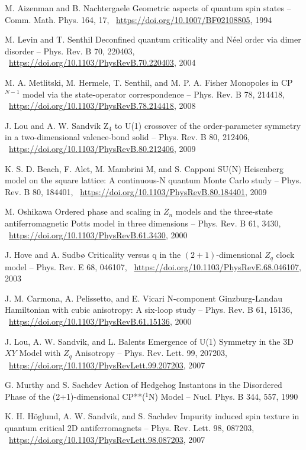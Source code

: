 \documentclass[11pt]{article}
\begin{document}
\begin{thebibliography}{3}
M. Aizenman and B. Nachtergaele Geometric aspects of quantum spin states -- Comm. Math. Phys. 164, 17,  ~\url{https://doi.org/10.1007/BF02108805}, 1994

M. Levin and T. Senthil Deconfined quantum criticality and Néel order via dimer disorder -- Phys. Rev. B 70, 220403,  ~\url{https://doi.org/10.1103/PhysRevB.70.220403}, 2004

M. A. Metlitski, M. Hermele, T. Senthil, and M. P. A. Fisher Monopoles in CP$^{N−1}$ model via the state-operator correspondence -- Phys. Rev. B 78, 214418, ~\url{https://doi.org/10.1103/PhysRevB.78.214418}, 2008

J. Lou and A. W. Sandvik Z$_4$ to U(1) crossover of the order-parameter symmetry in a two-dimensional valence-bond solid -- Phys. Rev. B 80, 212406,  ~\url{https://doi.org/10.1103/PhysRevB.80.212406}, 2009

K. S. D. Beach, F. Alet, M. Mambrini M, and S. Capponi SU(N) Heisenberg model on the square lattice: A continuous-N quantum Monte Carlo study -- Phys. Rev. B 80, 184401,  ~\url{https://doi.org/10.1103/PhysRevB.80.184401}, 2009

 M. Oshikawa Ordered phase and scaling in $Z_n$ models and the three-state antiferromagnetic Potts model in three dimensions -- Phys. Rev. B 61, 3430,  ~\url{https://doi.org/10.1103/PhysRevB.61.3430}, 2000

J. Hove and A. Sudbø Criticality versus q in the $(2+1)$-dimensional $Z_q$ clock model -- Phys. Rev. E 68, 046107,  ~\url{https://doi.org/10.1103/PhysRevE.68.046107}, 2003

J. M. Carmona, A. Pelissetto, and E. Vicari N-component Ginzburg-Landau Hamiltonian with cubic anisotropy: A six-loop study -- Phys. Rev. B 61, 15136,  ~\url{https://doi.org/10.1103/PhysRevB.61.15136}, 2000

J. Lou, A. W. Sandvik, and L. Balents Emergence of U(1) Symmetry in the 3D $XY$ Model with $Z_q$ Anisotropy -- Phys. Rev. Lett. 99, 207203,  ~\url{https://doi.org/10.1103/PhysRevLett.99.207203}, 2007

G. Murthy and S. Sachdev Action of Hedgehog Instantons in the Disordered Phase of the (2+1)-dimensional {CP}**($^1$N) Model -- Nucl. Phys. B 344, 557, 1990

K. H. Höglund, A. W. Sandvik, and S. Sachdev Impurity induced spin texture in quantum critical 2D antiferromagnets -- Phys. Rev. Lett. 98, 087203,  ~\url{https://doi.org/10.1103/PhysRevLett.98.087203}, 2007


\end{thebibliography}
\end{document}
